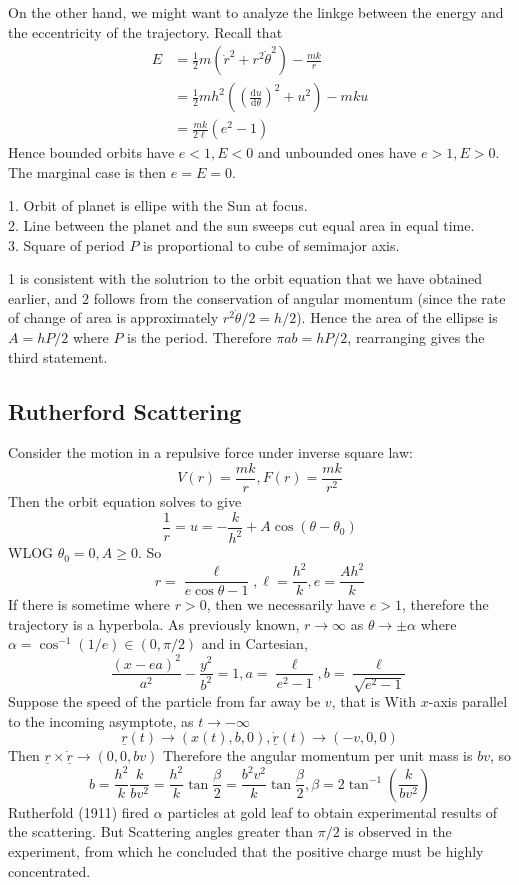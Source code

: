 On the other hand, we might want to analyze the linkge between the energy and the eccentricity of the trajectory.
Recall that
\begin{align*}
    E&=\frac{1}{2}m(\dot{r}^2+r^2\dot{\theta}^2)-\frac{mk}{r}\\
    &=\frac{1}{2}mh^2\left( \left( \frac{\mathrm du}{\mathrm d\theta} \right)^2+u^2 \right)-mku\\
    &=\frac{mk}{2\ell}(e^2-1)
\end{align*}
Hence bounded orbits have $e<1,E<0$ and unbounded ones have $e>1,E>0$.
The marginal case is then $e=E=0$.
\begin{law}
    1. Orbit of planet is ellipe with the Sun at focus.\\
    2. Line between the planet and the sun sweeps cut equal area in equal time.\\
    3. Square of period $P$ is proportional to cube of semimajor axis.
\end{law}
1 is consistent with the solutrion to the orbit equation that we have obtained earlier, and $2$ follows from the conservation of angular momentum (since the rate of change of area is approximately $r^2\dot\theta/2=h/2$).
Hence the area of the ellipse is $A=hP/2$ where $P$ is the period.
Therefore $\pi ab=hP/2$, rearranging gives the third statement.
\subsection{Rutherford Scattering}
Consider the motion in a repulsive force under inverse square law:
$$V(r)=\frac{mk}{r},F(r)=\frac{mk}{r^2}$$
Then the orbit equation solves to give
$$\frac{1}{r}=u=-\frac{k}{h^2}+A\cos(\theta-\theta_0)$$
WLOG $\theta_0=0,A\ge 0$.
So
$$r=\frac{\ell}{e\cos\theta-1},\ell=\frac{h^2}{k},e=\frac{Ah^2}{k}$$
If there is sometime where $r>0$, then we necessarily have $e>1$, therefore the trajectory is a hyperbola.
As previously known, $r\to\infty$ as $\theta\to\pm\alpha$ where $\alpha=\cos^{-1}(1/e)\in(0,\pi/2)$ and in Cartesian,
$$\frac{(x-ea)^2}{a^2}-\frac{y^2}{b^2}=1,a=\frac{\ell}{e^2-1},b=\frac{\ell}{\sqrt{e^2-1}}$$
Suppose the speed of the particle from far away be $v$, that is
With $x$-axis parallel to the incoming asymptote, as $t\to-\infty$
$$\underline{r}(t)\to (x(t),b,0),\underline{\dot{r}}(t)\to(-v,0,0)$$
Then $\underline{r}\times\underline{\dot{r}}\to(0,0,bv)$
Therefore the angular momentum per unit mass is $bv$, so
$$b=\frac{h^2}{k}\frac{k}{bv^2}=\frac{h^2}{k}\tan\frac{\beta}{2}=\frac{b^2v^2}{k}\tan\frac{\beta}{2},\beta=2\tan^{-1}\left( \frac{k}{bv^2} \right)$$
Rutherfold (1911) fired $\alpha$ particles at gold leaf to obtain experimental results of the scattering.
But Scattering angles greater than $\pi/2$ is observed in the experiment, from which he concluded that the positive charge must be highly concentrated.